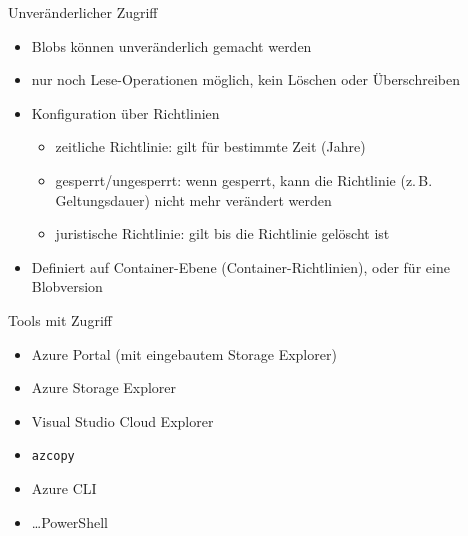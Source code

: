 \begin{flashcard}[Definition]{Unveränderlicher Zugriff}
  \begin{itemize}
    \item Blobs können unveränderlich gemacht werden
    \item nur noch Lese-Operationen möglich, kein Löschen oder Überschreiben
    \item Konfiguration über Richtlinien
      \begin{itemize}
        \item zeitliche Richtlinie: gilt für bestimmte Zeit (Jahre)
        \item gesperrt/ungesperrt: wenn gesperrt, kann die Richtlinie\newline
          (z.\,B. Geltungsdauer) nicht mehr verändert werden
        \item juristische Richtlinie: gilt bis die Richtlinie gelöscht ist
      \end{itemize}
    \item Definiert auf Container-Ebene (Container-Richtlinien), oder für eine Blobversion
  \end{itemize}
\end{flashcard}



\begin{flashcard}[Definition]{Tools mit Zugriff}
  \begin{itemize}
    \item Azure Portal (mit eingebautem Storage Explorer)
    \item Azure Storage Explorer
    \item Visual Studio Cloud Explorer
    \item \texttt{azcopy}
    \item Azure CLI
    \item \ldots PowerShell
  \end{itemize}
\end{flashcard}

